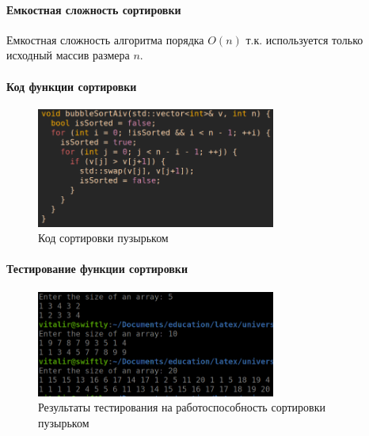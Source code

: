 \documentclass[a4paper, 14pt]{extarticle}
\begin{document}
\paragraph{Емкостная сложность сортировки}
Емкостная сложность алгоритма порядка $O(n)$ т.к. используется
только исходный массив размера  $n$.

\paragraph{Код функции сортировки}
\begin{figure}[htpb]
  \centering
  \includegraphics[width=0.7\textwidth]{pictures/first_sort_code.png}
  \caption{Код сортировки пузырьком}
  \label{fig:first_sort_code}
\end{figure}
\paragraph{Тестирование функции сортировки}
\begin{figure}[htpb]
  \centering
  \includegraphics[width=0.7\textwidth]{pictures/first_sort_test.png}
  \caption{Результаты тестирования на работоспособность сортировки пузырьком}
  \label{fig:first_sort_test}
\end{figure}
\newpage
\end{document}
